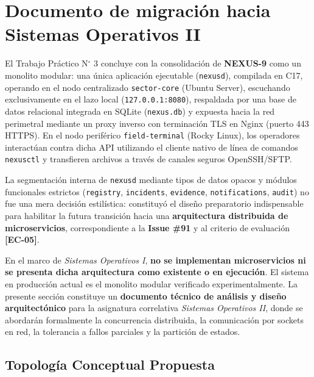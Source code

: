 \documentclass[10pt,a4paper]{article}
\begin{document}
\section{Documento de migración hacia Sistemas Operativos II}
\label{sec:migracion_so2}

El Trabajo Práctico N$^\circ$ 3 concluye con la consolidación de \textbf{NEXUS-9} como un monolito modular: una única aplicación ejecutable (\texttt{nexusd}), compilada en C17, operando en el nodo centralizado \texttt{sector-core} (Ubuntu Server), escuchando exclusivamente en el lazo local (\texttt{127.0.0.1:8080}), respaldada por una base de datos relacional integrada en SQLite (\texttt{nexus.db}) y expuesta hacia la red perimetral mediante un proxy inverso con terminación TLS en Nginx (puerto 443 HTTPS). En el nodo periférico \texttt{field-terminal} (Rocky Linux), los operadores interactúan contra dicha API utilizando el cliente nativo de línea de comandos \texttt{nexusctl} y transfieren archivos a través de canales seguros OpenSSH/SFTP.

La segmentación interna de \texttt{nexusd} mediante tipos de datos opacos y módulos funcionales estrictos (\texttt{registry}, \texttt{incidents}, \texttt{evidence}, \texttt{notifications}, \texttt{audit}) no fue una mera decisión estilística: constituyó el diseño preparatorio indispensable para habilitar la futura transición hacia una \textbf{arquitectura distribuida de microservicios}, correspondiente a la \textbf{Issue \#91} y al criterio de evaluación \textbf{[EC-05]}.

\begin{notabox}
En el marco de \textit{Sistemas Operativos I}, \textbf{no se implementan microservicios ni se presenta dicha arquitectura como existente o en ejecución}. El sistema en producción actual es el monolito modular verificado experimentalmente. La presente sección constituye un \textbf{documento técnico de análisis y diseño arquitectónico} para la asignatura correlativa \textit{Sistemas Operativos II}, donde se abordarán formalmente la concurrencia distribuida, la comunicación por sockets en red, la tolerancia a fallos parciales y la partición de estados.
\end{notabox}

\subsection{Topología Conceptual Propuesta}
\end{document}
